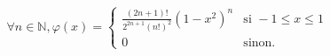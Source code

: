 \[
    \forall n \in \mathbb{N},
    \varphi(x) = \begin{cases}
        \frac{(2n + 1)!}{2^{2n+1} (n!)^2} (1 - x^2)^n
        & \mbox{si } -1 \leq x \leq 1
    \\
        0
        & \mbox{sinon.}
    \end{cases}
\]
